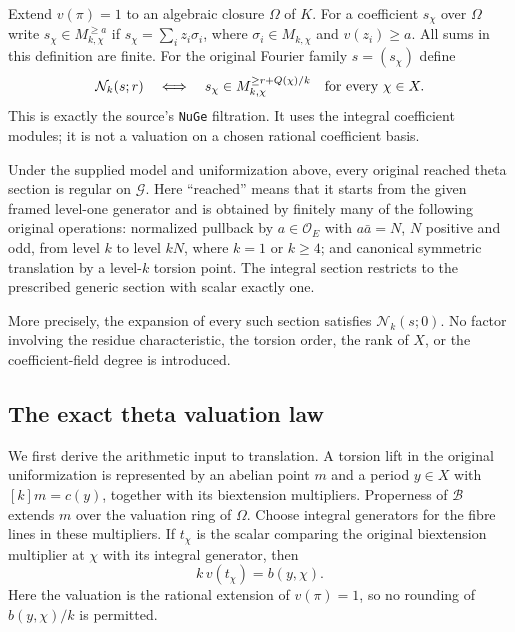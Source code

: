 Extend $v(\pi)=1$ to an algebraic closure $\Omega$ of $K$.
For a coefficient $s_\chi$ over $\Omega$ write
$s_\chi\in M_{k,\chi}^{\geq a}$ if
$s_\chi=\sum_i z_i\sigma_i$, where $\sigma_i\in M_{k,\chi}$ and
$v(z_i)\geq a$.  All sums in this definition are finite.  For the
original Fourier family $s=(s_\chi)$ define
\begin{equation}\label{eq:reached-weighted-filtration}
 \mathcal N_k(s;r)\quad\Longleftrightarrow\quad
 s_\chi\in M_{k,\chi}^{\geq r+Q(\chi)/k}
                  \quad\hbox{for every }\chi\in X.
\end{equation}
This is exactly the source's \texttt{NuGe} filtration.  It uses the
integral coefficient modules; it is not a valuation on a chosen
rational coefficient basis.

\begin{theorem}\label{thm:reached-sections-regular}
Under the supplied model and uniformization above, every original
reached theta section is regular on $\mathcal G$.  Here ``reached''
means that it starts from the given framed level-one generator and is
obtained by finitely many of the following original operations:
normalized pullback by $a\in\mathcal O_E$ with
$a\bar a=N$, $N$ positive and odd, from level $k$ to level $kN$,
where $k=1$ or $k\geq4$; and canonical symmetric translation by a
level-$k$ torsion point.  The integral section restricts to the
prescribed generic section with scalar exactly one.

More precisely, the expansion of every such section satisfies
$\mathcal N_k(s;0)$.  No factor involving the residue characteristic,
the torsion order, the rank of $X$, or the coefficient-field degree is
introduced.
\end{theorem}

\subsection*{The exact theta valuation law}

We first derive the arithmetic input to translation.  A torsion lift in
the original uniformization is represented by an abelian point $m$ and
a period $y\in X$ with $[k]m=c(y)$, together with its biextension
multipliers.  Properness of $\mathcal B$ extends $m$ over the valuation
ring of $\Omega$.  Choose integral generators for the fibre lines in
these multipliers.  If $t_\chi$ is the scalar comparing the original
biextension multiplier at $\chi$ with its integral generator, then
\begin{equation}\label{eq:reached-biextension-ratio}
                   k\,v(t_\chi)=b(y,\chi).
\end{equation}
Here the valuation is the rational extension of $v(\pi)=1$, so no
rounding of $b(y,\chi)/k$ is permitted.

